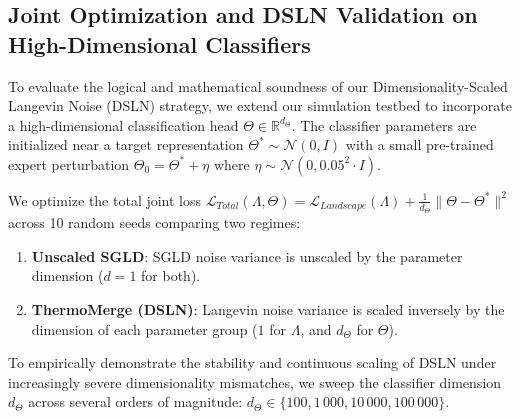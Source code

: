 \subsection{Joint Optimization and DSLN Validation on High-Dimensional Classifiers}
\label{sec:dsln_validation}
To evaluate the logical and mathematical soundness of our Dimensionality-Scaled Langevin Noise (DSLN) strategy, we extend our simulation testbed to incorporate a high-dimensional classification head $\Theta \in \mathbb{R}^{d_{\Theta}}$.
The classifier parameters are initialized near a target representation $\Theta^* \sim \mathcal{N}(0, I)$ with a small pre-trained expert perturbation $\Theta_0 = \Theta^* + \eta$ where $\eta \sim \mathcal{N}(0, 0.05^2 \cdot I)$.

We optimize the total joint loss $\mathcal{L}_{Total}(\Lambda, \Theta) = \mathcal{L}_{Landscape}(\Lambda) + \frac{1}{d_{\Theta}}\|\Theta - \Theta^*\|^2$ across 10 random seeds comparing two regimes:
\begin{enumerate}
    \item \textbf{Unscaled SGLD}: SGLD noise variance is unscaled by the parameter dimension ($d=1$ for both).
\item \textbf{ThermoMerge (DSLN)}: Langevin noise variance is scaled inversely by the dimension of each parameter group ($1$ for $\Lambda$, and $d_{\Theta}$ for $\Theta$).
\end{enumerate}

To empirically demonstrate the stability and continuous scaling of DSLN under increasingly severe dimensionality mismatches, we sweep the classifier dimension $d_{\Theta}$ across several orders of magnitude: $d_{\Theta} \in \{100, 1\,000, 10\,000, 100\,000\}$.

